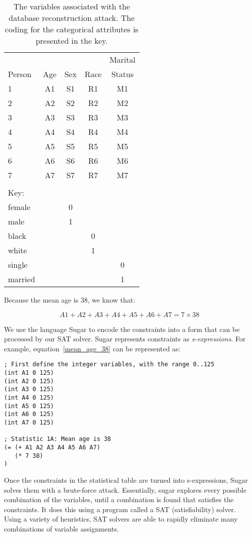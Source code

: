 \documentclass[runningheads]{llncs}
\begin{document}
\begin{table}
\caption{The variables associated with the database reconstruction
  attack. The coding for the categorical attributes is presented in the key.}\label{variables}
\begin{center}
\begin{tabular}{l|cccc}
       &     &     &      & Marital  \\
Person & Age & Sex & Race & Status   \\
\hline                             
1      & A1  & S1  & R1   & M1       \\
2      & A2  & S2  & R2   & M2       \\
3      & A3  & S3  & R3   & M3       \\
4      & A4  & S4  & R4   & M4       \\
5      & A5  & S5  & R5   & M5       \\
6      & A6  & S6  & R6   & M6       \\
7      & A7  & S7  & R7   & M7       \\
\hline
\multicolumn{1}{l}{}\\
\multicolumn{1}{l}{Key:}\\
\hline
female &     &  0  & \\
male   &     &  1  & \\
\hline
black  &     &     &  0   & \\
white  &     &     &  1   & \\
\hline
single &     &     &      &   0\\
married&     &     &      &   1\\
\hline
\end{tabular}
\end{center}
\end{table}

Because the mean age is 38, we know that:

\begin{equation}
A1 + A2 + A3 + A4 + A5 + A6 + A7 = 7 \times 38
\label{mean_age_38}
\end{equation}

We use the language Sugar\cite{sugar} to encode the constraints
into a form that can be processed by our SAT solver. Sugar represents
constraints as
\textit{s-expressions}\cite{McCarthy:1960:RFS:367177.367199}. For
example, equation~\ref{mean_age_38} can be represented as:

\begin{Verbatim}
; First define the integer variables, with the range 0..125
(int A1 0 125)
(int A2 0 125)
(int A3 0 125)
(int A4 0 125)
(int A5 0 125)
(int A6 0 125)
(int A7 0 125)

; Statistic 1A: Mean age is 38
(= (+ A1 A2 A3 A4 A5 A6 A7)
   (* 7 38)
)
\end{Verbatim}
Once the constraints in the statistical table are turned into
s-expressions, Sugar solves them with a brute-force attack.
Essentially, sugar explores every possible combination of the variables,
until a combination is found that satisfies the constraints. It does
this using a program called a SAT (satisfiability) solver. Using a
variety of heuristics, SAT solvers are able to rapidly eliminate many
combinations of variable assignments.
\end{document}
